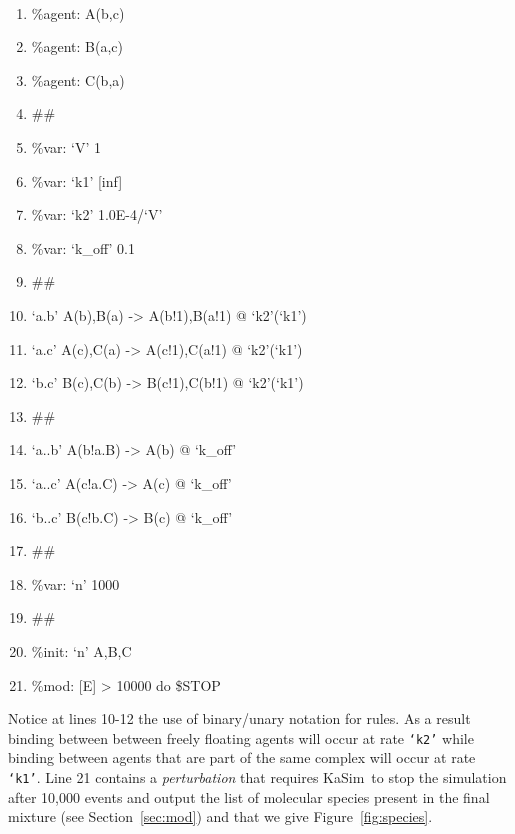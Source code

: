 \documentclass[11pt]{book}
\def\KaSim{\textsf{KaSim}}
\def\ttt#1{\texttt{#1}}
\begin{document}
{\tt\footnotesize
\begin{enumerate}
\item \%agent: A(b,c)
\item \%agent: B(a,c)
\item \%agent: C(b,a)
\item \#\#
\item \%var: `V' 1
\item \%var: `k1' [inf]
\item \%var: `k2' 1.0E-4/`V'
\item \%var: `k\_off' 0.1
\item \#\#
\item `a.b' A(b),B(a) -> A(b!1),B(a!1) @ `k2'(`k1')
\item `a.c' A(c),C(a) -> A(c!1),C(a!1) @ `k2'(`k1')
\item `b.c' B(c),C(b) -> B(c!1),C(b!1) @ `k2'(`k1')
\item \#\#
\item `a..b' A(b!a.B) -> A(b) @ `k\_off'
\item `a..c' A(c!a.C) -> A(c) @ `k\_off'
\item `b..c' B(c!b.C) -> B(c) @ `k\_off'
\item \#\#
\item \%var: `n' 1000
\item \#\#
\item \%init: `n' A,B,C
\item \%mod: [E] > 10000 do \$STOP 
\end{enumerate}
}

Notice at lines 10-12 the use of binary/unary notation for rules. As a result binding between between freely floating agents will occur at rate \ttt{`k2'} while binding between agents that are part of the same complex will occur at rate \ttt{`k1'}. Line 21 contains a \emph{perturbation} that requires \KaSim~to stop the simulation after 10,000 events and output the list of molecular species present in the final mixture (see Section~\ref{sec:mod}) and that we give Figure~\ref{fig:species}.
\end{document}
